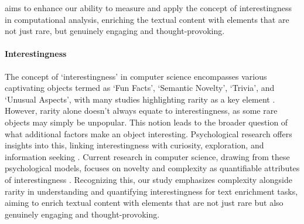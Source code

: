 \documentclass[11pt]{article}
\begin{document}
aims to enhance our ability to measure and apply the concept of interestingness in computational analysis, enriching the textual content with elements that are not just rare, but genuinely engaging and thought-provoking. 



\paragraph{\textbf{Interestingness}}The concept of `interestingness' in computer science encompasses various captivating objects termed as `Fun Facts', `Semantic Novelty', `Trivia', and `Unusual Aspects', with many studies highlighting rarity as a key element \cite{DBLP:conf/wsdm/TsurelPGS17,DBLP:conf/emnlp/MaPMC00G21,DBLP:conf/aaai/FatmaCS17,DBLP:conf/ijcai/PrakashCPG15}. However, rarity alone doesn't always equate to interestingness, as some rare objects may simply be unpopular. This notion leads to the broader question of what additional factors make an object interesting. Psychological research offers insights into this, linking interestingness with curiosity, exploration, and information seeking \cite{bolton1910attention,tomkins1962affect,fredrickson1998good,izard2000motivational,schraw2001situational,krapp1999interest}. Current research in computer science, drawing from these psychological models, focuses on novelty and complexity as quantifiable attributes of interestingness \cite{berlyne1960conflict,berlyne1974studies,silvia2005interesting}. Recognizing this, our study emphasizes complexity alongside rarity in understanding and quantifying interestingness for text enrichment tasks, aiming to enrich textual content with elements that are not just rare but also genuinely engaging and thought-provoking.
\end{document}
